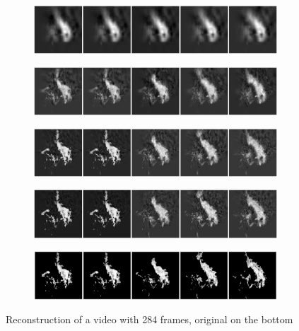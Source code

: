 \documentclass{article}
\begin{document}
\begin{figure}
	\centering
	\begin{subfigure}{\textwidth}
		\includegraphics[width=\textwidth]{visuals/Underconstrained_flicker_g1_c28_10.png}
	\end{subfigure}
	\begin{subfigure}{\textwidth}
		\includegraphics[width=\textwidth]{visuals/Underconstrained_flicker_g1_c28_50.png}
	\end{subfigure}
	\begin{subfigure}{\textwidth}
		\includegraphics[width=\textwidth]{visuals/Underconstrained_flicker_g1_c28_100.png}
	\end{subfigure}
	\begin{subfigure}{\textwidth}
		\includegraphics[width=\textwidth]{visuals/Underconstrained_flicker_g1_c28_128.png}
	\end{subfigure}
	\begin{subfigure}{\textwidth}
		\includegraphics[width=\textwidth]{visuals/Underconstrained_flicker_g1_c28.png}
	\end{subfigure}
	\caption{Reconstruction of a video with 284 frames, original on the bottom}
	\label{fig:reconstruction-2}
\end{figure}
\end{document}
